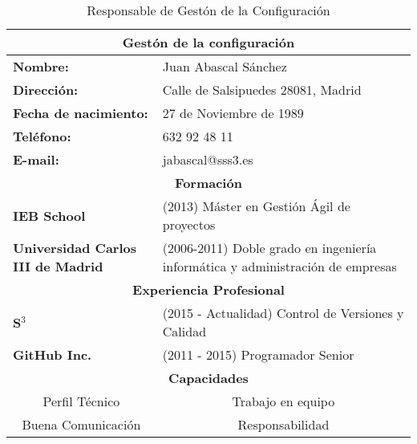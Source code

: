 \begin{table}[H]
\begin{center}
\begin{tabular}{p{} p{9cm}}
\multicolumn{2}{c}{\Large{\textbf{Gestón de la configuración}}} \\
\hline
\textbf{Nombre:} & Juan Abascal Sánchez\\
\textbf{Dirección:} &  Calle de Salsipuedes 28081, Madrid\\
\textbf{Fecha de nacimiento:} & 27 de Noviembre de 1989 \\
\textbf{Teléfono:} & 632 92 48 11\\
\textbf{E-mail:} & jabascal@sss3.es\\
\hline \hline
\multicolumn{2}{c}{\textbf{Formación} } \\
\hline
\textbf{IEB School} & (2013) Máster en Gestión Ágil de proyectos\\
\textbf{Universidad Carlos III de Madrid} & (2006-2011) Doble grado en ingeniería informática y administración de empresas\\
\hline \hline
\multicolumn{2}{c}{\textbf{Experiencia Profesional} } \\
\hline
\textbf{S$^3$} & (2015 - Actualidad)  Control de Versiones y Calidad\\
\textbf{GitHub Inc.} & (2011 - 2015) Programador Senior \\
\hline \hline
\multicolumn{2}{c}{\textbf{Capacidades} } \\
\hline
\multicolumn{1}{c}{Perfil Técnico} & \multicolumn{1}{c}{Trabajo en equipo} \\
\multicolumn{1}{c}{Buena Comunicación} & \multicolumn{1}{c}{Responsabilidad} \\
\hline
\end{tabular}
\caption{Responsable de Gestón de la Configuración}
\label{tab:gestConfiguracion}
\end{center}
\end{table}

